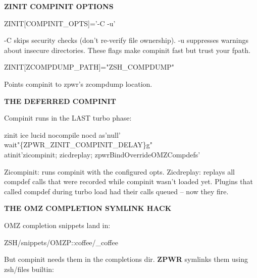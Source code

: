 \documentclass[11pt,a4paper,twoside]{book}
\begin{document}
\vspace{12pt}
{\bfseries\color{neonyellow} ZINIT COMPINIT OPTIONS}\vspace{4pt}

\begin{codebox}
\color{neongreen}ZINIT[COMPINIT\_OPTS]='-C -u'\\
\end{codebox}

-C skips security checks (don't re-verify file ownership). -u suppresses warnings about insecure directories. These flags make compinit fast but trust your fpath.

\begin{codebox}
\color{neongreen}ZINIT[ZCOMPDUMP\_PATH]="ZSH\_COMPDUMP"\\
\end{codebox}

Points compinit to zpwr's zcompdump location.


\vspace{12pt}
{\bfseries\color{neonyellow} THE DEFERRED COMPINIT}\vspace{4pt}

Compinit runs in the LAST turbo phase:

\begin{codebox}
\color{neongreen}zinit ice lucid nocompile nocd as'null'\\
\color{neongreen}wait"\{ZPWR\_ZINIT\_COMPINIT\_DELAY\}g"\\
\color{neongreen}atinit'zicompinit; zicdreplay; zpwrBindOverrideOMZCompdefs'\\
\end{codebox}

Zicompinit: runs compinit with the configured opts. Zicdreplay: replays all compdef calls that were recorded while compinit wasn't loaded yet. Plugins that called compdef during turbo load had their calls queued -- now they fire.


\vspace{12pt}
{\bfseries\color{neonyellow} THE OMZ COMPLETION SYMLINK HACK}\vspace{4pt}

OMZ completion snippets land in:

\begin{codebox}
\color{neongreen}ZSH/snippets/OMZP::coffee/\_coffee\\
\end{codebox}

But compinit needs them in the completions dir. \textbf{ZPWR} symlinks them using zsh/files builtin:
\end{document}
